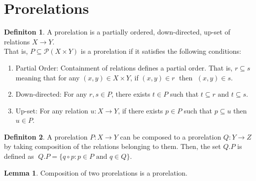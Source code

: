 \documentclass[18pt,a4paper]{article}
\theoremstyle{definition}
\newtheorem{definition}{Definiton}[section]
\newtheorem{lemma}{Lemma}[definition]
\begin{document}
\section{Prorelations}

\begin{definition}%
	A prorelation is a partially ordered, down-directed, up-set of relations $X \to Y$.\\
	That is, $P \subseteq \mathcal{P}(X \times Y)$ is a prorelation if it satisfies the
	following conditions:
	\begin{enumerate}[label=(\roman*)]
		\item Partial Order: Containment of relations defines a partial order.
			That is, $r \subseteq s$  meaning that for any $(x,y) \in X \times Y$,
			if  $(x,y)\in r\;$ then $\;(x,y)\in s$.
		\item Down-directed: For any $r,s \in P$, there exists $t \in P $ such that
			$t\subseteq r \text{ and } t \subseteq s$.
		\item Up-set: For any relation $u:X\to Y$, if there exists $p \in P$ such that
			$p \subseteq u $ then $u \in P$.
	\end{enumerate}
\end{definition}
\begin{definition}%
	A prorelation $P:X \to Y$ can be composed to a prorelation $Q:Y \to Z$ by taking
	composition of the relations belonging to them. Then, the set $Q.P$ is defined as
	$\; Q.P=\{q \circ p : p \in P \text{ and } q \in Q  \}$.
\end{definition}
\begin{lemma}
	Composition of two prorelations is a prorelation.
\end{lemma}
\end{document}
